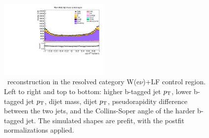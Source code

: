 \begin{figure}[tbp]
\begin{center}
    \includegraphics[width=0.48\textwidth]{figures/wlnhbb2016/resolved/WenWHLightFlavorCR_hbbCosThetaCSJ1.pdf}
    \caption{\HBB\ reconstruction in the resolved category W(e$\nu$)+LF control region.
    Left to right and top to bottom: higher b-tagged jet $p_{\mathrm{T}}$, lower b-tagged jet $p_{\mathrm{T}}$, dijet mass, dijet $p_{\mathrm{T}}$, 
    pseudorapidity difference between the two jets, and the Collins-Soper angle of the harder b-tagged jet.
    The simulated shapes are prefit, with the postfit normalizations applied.}
    \label{fig:res_WenLF_Hbb}
  \end{center}
\end{figure}
\clearpage

